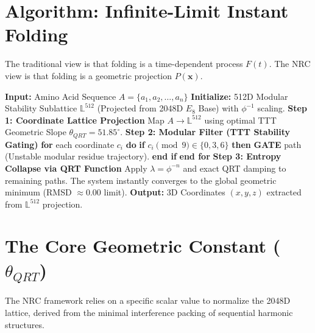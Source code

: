 \section{Algorithm: Infinite-Limit Instant Folding}

The traditional view is that folding is a time-dependent process $F(t)$. The NRC view is that folding is a geometric projection $P(\mathbf{x})$.

\begin{algorithm}
	\caption{NRC Deterministic Folding Protocol}
	\begin{algorithmic}[1]
		\State \textbf{Input:} Amino Acid Sequence $A = \{a_1, a_2, \dots, a_n\}$
		\State \textbf{Initialize:} 512D Modular Stability Sublattice $\mathbb{L}^{512}$ (Projected from 2048D $E_8$ Base) with $\phi^{-1}$ scaling.
		\State \textbf{Step 1: Coordinate Lattice Projection}
		\State \quad Map $A \to \mathbb{L}^{512}$ using optimal TTT Geometric Slope $\theta_{QRT} = 51.85^\circ$.
		\State \textbf{Step 2: Modular Filter (TTT Stability Gating)}
		\State \quad \textbf{for} each coordinate $c_i$ \textbf{do}
		\State \quad \quad \textbf{if} $c_i \pmod{9} \in \{0, 3, 6\}$ \textbf{then}
		\State \quad \quad \quad \textbf{GATE} path (Unstable modular residue trajectory).
		\State \quad \quad \textbf{end if}
		\State \quad \textbf{end for}
		\State \textbf{Step 3: Entropy Collapse via QRT Function}
		\State \quad Apply $\lambda = \phi^{-n}$ and exact QRT damping to remaining paths.
		\State \quad The system instantly converges to the global geometric minimum (RMSD $\approx 0.00$ limit).
		\State \textbf{Output:} 3D Coordinates $(x,y,z)$ extracted from $\mathbb{L}^{512}$ projection.
	\end{algorithmic}
\end{algorithm}

\section{The Core Geometric Constant ($\theta_{QRT}$)}

The NRC framework relies on a specific scalar value to normalize the 2048D lattice, derived from the minimal interference packing of sequential harmonic structures. 


